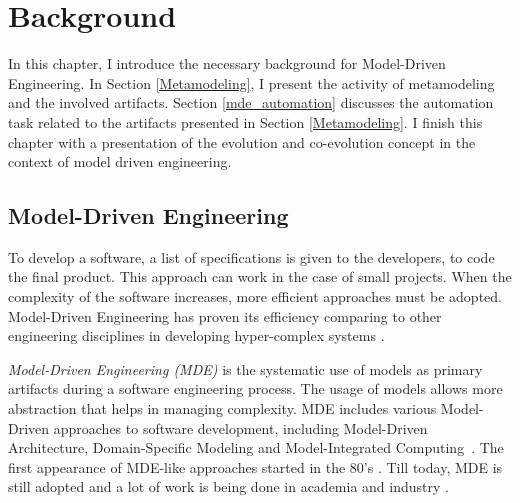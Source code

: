 \clearemptydoublepage
\chapter{Background}

In this chapter, I introduce the necessary background for Model-Driven Engineering. In Section \ref{Metamodeling}, I present the activity of metamodeling and the involved artifacts. Section \ref{mde_automation} discusses the automation task related to the artifacts presented in Section \ref{Metamodeling}. I finish this chapter with a presentation of the evolution and co-evolution concept in the context of model driven engineering.

\section{Model-Driven Engineering}
\label{mde}
To develop a software, a list of specifications is given to the developers, to code the final product. This approach can work in the case of small projects. When the complexity of the software increases, more efficient approaches must be adopted. Model-Driven Engineering has proven its efficiency comparing to other engineering disciplines in developing hyper-complex systems \cite{1231146}.

\textit{Model-Driven Engineering (MDE)} is the systematic use of models as primary artifacts during a software engineering process. The usage of models allows more abstraction that helps in managing complexity. MDE includes various Model-Driven approaches to software development, including Model-Driven Architecture, Domain-Specific Modeling and Model-Integrated Computing~\cite{10.1145/1985793.1985882}. The first appearance of MDE-like approaches started in the 80's \cite{10.1007/s10270-005-0079-0}. Till today, MDE is still adopted  and a lot of work is being done in academia and industry \cite{Mohagheghi2009,mohagheghi2008proof,jongeling2022Structural,wortmann2020modeling}.



